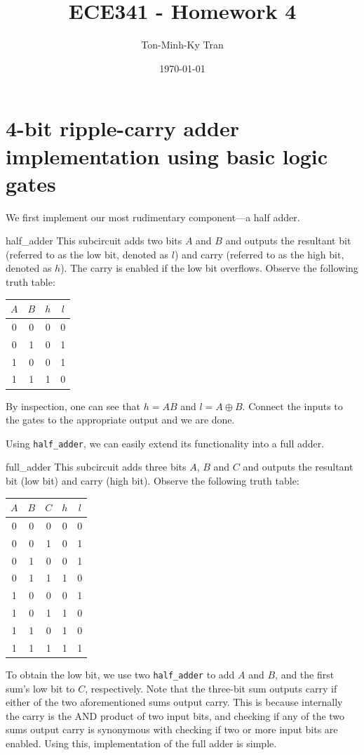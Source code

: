 \documentclass{exam}
\title{ECE341 - Homework 4}
\author{Ton-Minh-Ky Tran}
\date{\today}
\newcommand{\lxor}{\oplus}
\begin{document}
\maketitle
\section{4-bit ripple-carry adder implementation using basic logic gates}
We first implement our most rudimentary component---a half adder.
\begin{subcircuit}{half\_adder}
	This subcircuit adds two bits $A$ and $B$ and outputs the resultant bit (referred to as the low bit, denoted as $l$) and carry (referred to as the high bit, denoted as $h$). The carry is enabled if the low bit overflows. Observe the following truth table:
	\begin{center}
		\bgroup
		\def\arraystretch{1.2}
		\begin{tabular}{cc|cc}
			$A$ & $B$ & $h$ & $l$ \\
			\hline
			0 & 0 & 0 & 0 \\
			0 & 1 & 0 & 1 \\
			1 & 0 & 0 & 1 \\
			1 & 1 & 1 & 0
		\end{tabular}
		\egroup
	\end{center}
	By inspection, one can see that $h = AB$ and $l = A \lxor B$. Connect the inputs to the gates to the appropriate output and we are done.
\end{subcircuit}

Using \verb|half_adder|, we can easily extend its functionality into a full adder.
\begin{subcircuit}{full\_adder}
	This subcircuit adds three bits $A$, $B$ and $C$ and outputs the resultant bit (low bit) and carry (high bit). Observe the following truth table:
	\begin{center}
		\bgroup
		\def\arraystretch{1.2}
		\begin{tabular}{ccc|cc}
			$A$ & $B$ & $C$ & $h$ & $l$ \\
			\hline
			0 & 0 & 0 & 0 & 0 \\
			0 & 0 & 1 & 0 & 1 \\
			0 & 1 & 0 & 0 & 1 \\
			0 & 1 & 1 & 1 & 0 \\
			1 & 0 & 0 & 0 & 1 \\
			1 & 0 & 1 & 1 & 0 \\
			1 & 1 & 0 & 1 & 0 \\
			1 & 1 & 1 & 1 & 1
		\end{tabular}
		\egroup
	\end{center}
	To obtain the low bit, we use two \verb|half_adder| to add $A$ and $B$, and the first sum's low bit to $C$, respectively. Note that the three-bit sum outputs carry if either of the two aforementioned sums output carry. This is because internally the carry is the AND product of two input bits, and checking if any of the two sums output carry is synonymous with checking if two or more input bits are enabled. Using this, implementation of the full adder is simple.
\end{subcircuit}
\end{document}
